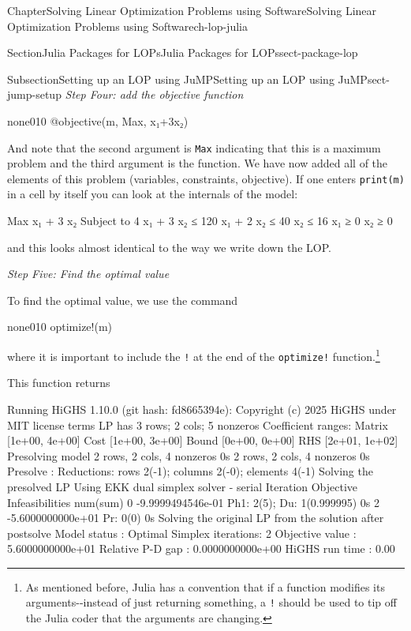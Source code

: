 \documentclass[oneside,10pt,]{book}
\newcommand{\mono}[1]{\texttt{#1}}
\numberwithin{equation}{section}
\begin{document}
\begin{chapterptx}{Chapter}{Solving Linear Optimization Problems using Software}{}{Solving Linear Optimization Problems using Software}{}{}{ch-lop-julia}
\begin{sectionptx}{Section}{Julia Packages for LOPs}{}{Julia Packages for LOPs}{}{}{sect-package-lop}
\begin{subsectionptx}{Subsection}{Setting up an LOP using JuMP}{}{Setting up an LOP using JuMP}{}{}{sect-jump-setup}
\emph{Step Four: add the objective function}%
\begin{program}{none}{0}{1}{0}
@objective(m, Max, x₁+3x₂)
\end{program}
And note that the second argument is \mono{Max} indicating that this is a maximum problem and the third argument is the function. We have now added all of the elements of this problem (variables, constraints, objective). If one enters \mono{print(m)} in a  cell by itself you can look at the internals of the model:%
\par
%
\begin{codedisplay}
Max x₁ + 3 x₂
Subject to
 4 x₁ + 3 x₂ ≤ 120
 x₁ + 2 x₂ ≤ 40
 x₂ ≤ 16
 x₁ ≥ 0
 x₂ ≥ 0
\end{codedisplay}
%
\par
and this looks almost identical to the way we write down the LOP.%
\par
\emph{Step Five: Find the optimal value}%
\par
To find the optimal value, we use the command%
\begin{program}{none}{0}{1}{0}
optimize!(m)
\end{program}
where it is important to include the \mono{!} at the end of the \mono{optimize!} function.\footnote{As mentioned before, Julia has a convention that if a function modifies its arguments-{}-{}instead of just returning something, a \mono{!} should be used to tip off the Julia coder that the arguments are changing.\label{sect-jump-setup-25-3}}%
\par
This function returns%
\par
%
\begin{codedisplay}
Running HiGHS 1.10.0 (git hash: fd8665394e): Copyright (c) 2025 HiGHS under MIT license terms
  LP   has 3 rows; 2 cols; 5 nonzeros
  Coefficient ranges:
    Matrix [1e+00, 4e+00]
    Cost   [1e+00, 3e+00]
    Bound  [0e+00, 0e+00]
    RHS    [2e+01, 1e+02]
  Presolving model
  2 rows, 2 cols, 4 nonzeros  0s
  2 rows, 2 cols, 4 nonzeros  0s
  Presolve : Reductions: rows 2(-1); columns 2(-0); elements 4(-1)
  Solving the presolved LP
  Using EKK dual simplex solver - serial
    Iteration        Objective     Infeasibilities num(sum)
            0    -9.9999494546e-01 Ph1: 2(5); Du: 1(0.999995) 0s
            2    -5.6000000000e+01 Pr: 0(0) 0s
  Solving the original LP from the solution after postsolve
  Model status        : Optimal
  Simplex   iterations: 2
  Objective value     :  5.6000000000e+01
  Relative P-D gap    :  0.0000000000e+00
  HiGHS run time      :          0.00

\end{codedisplay}
\end{subsectionptx}
\end{sectionptx}
\end{chapterptx}
\end{document}

